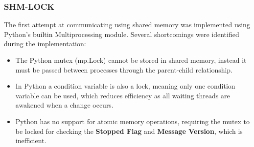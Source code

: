\documentclass[conference]{IEEEtran}
\begin{document}
\subsubsection{\textbf{SHM-LOCK}}
The first attempt at communicating using shared memory was implemented using Python's builtin Multiprocessing module.
Several shortcomings were identified during the implementation:
\begin{itemize}
    \item The Python mutex (mp.Lock) cannot be stored in shared memory, instead it must be passed between processes through the parent-child relationship.
    \item In Python a condition variable is also a lock, meaning only one condition variable can be used, which reduces efficiency as all waiting threads are awakened when a change occurs.
    \item Python has no support for atomic memory operations, requiring the mutex to be locked for checking the \textbf{Stopped Flag} and \textbf{Message Version}, which is inefficient.
\end{itemize}
\end{document}
